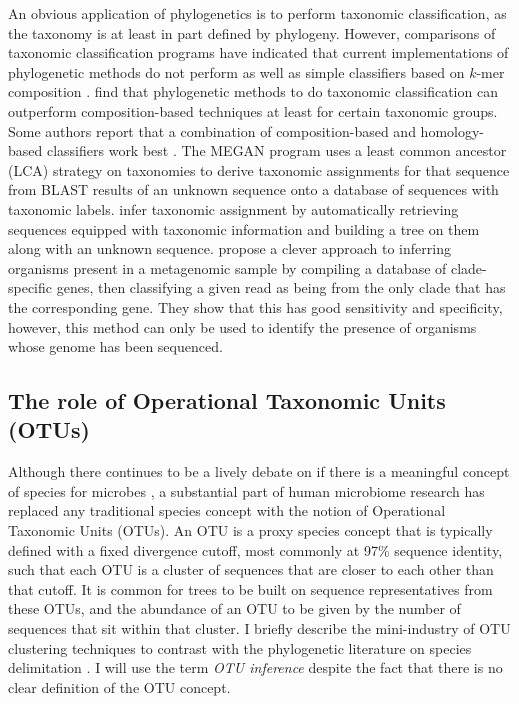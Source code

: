 \documentclass{amsart}
\begin{document}
An obvious application of phylogenetics is to perform taxonomic classification, as the taxonomy is at least in part defined by phylogeny.
However, comparisons of taxonomic classification programs \citep{liu2008accurate,bazinet2012comparative} have indicated that current implementations of phylogenetic methods do not perform as well as simple classifiers based on $k$-mer composition \citep{wang2007naive,rosen2008metagenome}.
\citet{srinivasan2012bacterial} find that phylogenetic methods to do taxonomic classification can outperform composition-based techniques at least for certain taxonomic groups.
Some authors report that a combination of composition-based and homology-based classifiers work best \citep{brady2009phymm,parks2011classifying}.
The MEGAN program \citep{huson2007megan,huson2011integrative} uses a least common ancestor (LCA) strategy on taxonomies to derive taxonomic assignments for that sequence from BLAST results of an unknown sequence onto a database of sequences with taxonomic labels.
\citet{munch2008statistical,munch2008fast} infer taxonomic assignment by automatically retrieving sequences equipped with taxonomic information and building a tree on them along with an unknown sequence.
\citet{segata2012metagenomic} propose a clever approach to inferring organisms present in a metagenomic sample by compiling a database of clade-specific genes, then classifying a given read as being from the only clade that has the corresponding gene.
They show that this has good sensitivity and specificity, however, this method can only be used to identify the presence of organisms whose genome has been sequenced.

\subsection{The role of Operational Taxonomic Units (OTUs)}
Although there continues to be a lively debate on if there is a meaningful concept of species for microbes \citep{bapteste2009prokaryotic,caro2012bacterial}, a substantial part of human microbiome research has replaced any traditional species concept with the notion of Operational Taxonomic Units (OTUs).
An OTU is a proxy species concept that is typically defined with a fixed divergence cutoff, most commonly at 97\% sequence identity, such that each OTU is a cluster of sequences that are closer to each other than that cutoff.
It is common for trees to be built on sequence representatives from these OTUs, and the abundance of an OTU to be given by the number of sequences that sit within that cluster.
I briefly describe the mini-industry of OTU clustering techniques to contrast with the phylogenetic literature on species delimitation \citep{pons2006sequence,yang2010bayesian}.
I will use the term \emph{OTU inference} despite the fact that there is no clear definition of the OTU concept.
\end{document}
